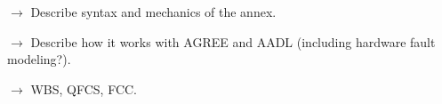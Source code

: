 \documentclass{llncs}
\begin{document}


%


$\rightarrow$ Describe syntax and mechanics of the annex.


$\rightarrow$ Describe how it works with AGREE and AADL (including hardware fault modeling?).


$\rightarrow$ WBS, QFCS, FCC.




\vspace{0.08in}







~

%
%


\end{document}
